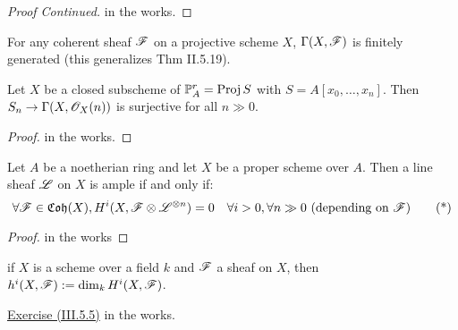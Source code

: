  \setcounter{lecture}{15}

 \begin{proof}[Proof Continued]
 in the works.
 \end{proof}

 \begin{corollary}
 For any coherent sheaf $\mathscr{F}$ on a projective scheme $X$,
 $\Gamma(X,\mathscr{F})$ is finitely generated (this generalizes Thm
 II.5.19).
 \end{corollary}

 \begin{corollary}
 Let $X$ be a closed subscheme of $\mathbb{P}^r_A=\text{\rm Proj\,} S$ with
 $S=A[x_0,\dots, x_n]$.  Then $S_n\to \Gamma(X,\mathscr{O}_X(n))$ is
 surjective for all $n \gg 0$.
 \end{corollary}
 \begin{proof}
 in the works.
 \end{proof}

 \begin{proposition}[III.5.3]
 Let $A$ be a noetherian ring and let $X$ be a proper scheme over
 $A$.  Then a line sheaf $\mathscr{L}$ on $X$ is ample if and only if:
 \[
    \forall \mathscr{F}\in \mathfrak{Coh}(X), H^i(X,\mathscr{F}\otimes \mathscr{L}^{\otimes n})=0
    \quad\forall i>0, \forall n\gg 0 \text{ (depending on $\mathscr{F}$)} \tag{*}
 \]
 \end{proposition}
 \begin{proof}
 in the works
 \end{proof}

 \begin{definition} if $X$ is a scheme over a field $k$ and $\mathscr{F}$ a
 sheaf on $X$, then $h^i(X,\mathscr{F}):= \dim_k H^i(X,\mathscr{F})$.
 \end{definition}

 \underline{Exercise (III.5.5)} in the works.
